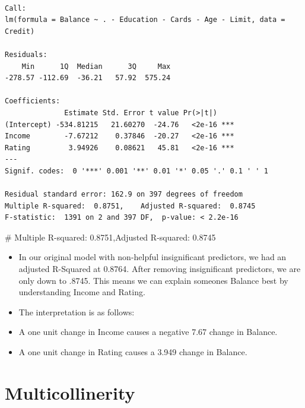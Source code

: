\documentclass[
  letterpaper,
  DIV=11,
  numbers=noendperiod]{scrreprt}
\newenvironment{Shaded}{\begin{snugshade}}{\end{snugshade}}
\newcommand{\CommentTok}[1]{\textcolor[rgb]{0.37,0.37,0.37}{#1}}
\providecommand{\tightlist}{%
  \setlength{\itemsep}{0pt}\setlength{\parskip}{0pt}}\usepackage{longtable,booktabs,array}
\begin{document}
\begin{verbatim}

Call:
lm(formula = Balance ~ . - Education - Cards - Age - Limit, data = Credit)

Residuals:
    Min      1Q  Median      3Q     Max 
-278.57 -112.69  -36.21   57.92  575.24 

Coefficients:
              Estimate Std. Error t value Pr(>|t|)    
(Intercept) -534.81215   21.60270  -24.76   <2e-16 ***
Income        -7.67212    0.37846  -20.27   <2e-16 ***
Rating         3.94926    0.08621   45.81   <2e-16 ***
---
Signif. codes:  0 '***' 0.001 '**' 0.01 '*' 0.05 '.' 0.1 ' ' 1

Residual standard error: 162.9 on 397 degrees of freedom
Multiple R-squared:  0.8751,    Adjusted R-squared:  0.8745 
F-statistic:  1391 on 2 and 397 DF,  p-value: < 2.2e-16
\end{verbatim}

\begin{Shaded}
\begin{Highlighting}[]
\CommentTok{\# Multiple R{-}squared: 0.8751,Adjusted R{-}squared: 0.8745}
\end{Highlighting}
\end{Shaded}

\begin{itemize}
\tightlist
\item
  In our original model with non-helpful insignificant predictors, we
  had an adjusted R-Squared at 0.8764. After removing insignificant
  predictors, we are only down to .8745. This means we can explain
  someones Balance best by understanding Income and Rating.
\item
  The interpretation is as follows:
\item
  A one unit change in Income causes a negative 7.67 change in Balance.
\item
  A one unit change in Rating causes a 3.949 change in Balance.
\end{itemize}


\chapter{Multicollinerity}\label{multicollinerity}
\end{document}
